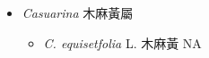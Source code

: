 
  \begin{itemize}
 \item[] \textit{Casuarina} 木麻黃屬
                                
  \begin{itemize}
        \item[] \textit{C. equisetfolia} L.  木麻黃   NA
  \end{itemize}
  \end{itemize}
